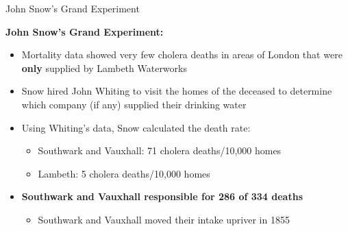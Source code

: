 \documentclass[10pt,xcolor=table,ignorenonframetext,handout,aspectratio=169]{beamer}
\newlength{\wideitemsep}
\let\olditem\item
\renewcommand{\item}{\setlength{\itemsep}{\wideitemsep}\olditem}
\begin{document}
\begin{frame}{John Snow's Grand Experiment}

\medskip
\textbf{John Snow's Grand Experiment:}

\medskip
\begin{itemize}
	
	\item Mortality data showed very few cholera deaths in areas of London that were \textbf{only} supplied by Lambeth Waterworks
	
	\item Snow hired John Whiting to visit the homes of the deceased to determine which company (if any) supplied their drinking water
	
	\item Using Whiting's data, Snow calculated the death rate:
	
	\medskip
	\begin{itemize}
		
		\item Southwark and Vauxhall:  71 cholera deaths/10,000 homes
		
		\item Lambeth:  5 cholera deaths/10,000 homes
		
	\end{itemize}
	
	\pause
	\item \textbf{Southwark and Vauxhall responsible for 286 of 334 deaths}
	
	\medskip
	\begin{itemize}
		
		\item Southwark and Vauxhall moved their intake upriver in 1855
		
	\end{itemize}
	
\end{itemize}

\end{frame}



\end{document}
